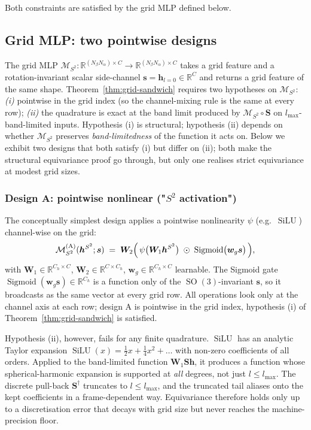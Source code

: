 \documentclass[11pt,a4paper]{article}
\DeclareMathOperator{\SO}{SO}
\DeclareMathOperator{\SiLU}{SiLU}
\DeclareMathOperator{\Sigmoid}{Sigmoid}
\newcommand{\R}{\mathbb{R}}
\newcommand{\Sph}{S^2}
\newcommand{\bh}{\bm{h}}
\newcommand{\lmax}{l_{\max}}
\theoremstyle{plain}
\theoremstyle{definition}
\theoremstyle{remark}
\begin{document}
Both constraints are satisfied by the grid MLP defined below.

\subsection{Grid MLP: two pointwise designs}\label{sec:gridmlp}

The grid MLP $\mathcal{M}_{\Sph}\colon\R^{(N_\beta N_\alpha)\times
        C}\to\R^{(N_\beta N_\alpha)\times C}$ takes a grid feature and a
rotation-invariant scalar side-channel $\bm{s}=\bh_{l=0}\in\R^C$ and returns a
grid feature of the same shape. Theorem~\ref{thm:grid-sandwich} requires two
hypotheses on $\mathcal{M}_{\Sph}$: \emph{(i)} pointwise in the grid index (so
the channel-mixing rule is the same at every row); \emph{(ii)} the quadrature
is exact at the band limit produced by $\mathcal{M}_{\Sph}\circ\bm{S}$ on
$\lmax$-band-limited inputs. Hypothesis (i) is structural; hypothesis (ii)
depends on whether $\mathcal{M}_{\Sph}$ preserves \emph{band-limitedness} of
the function it acts on. Below we exhibit two designs that both satisfy (i) but
differ on (ii); both make the structural equivariance proof go through, but
only one realises strict equivariance at modest grid sizes.

\subsubsection*{Design A: pointwise nonlinear ("$S^2$ activation")}

The conceptually simplest design applies a pointwise nonlinearity $\psi$ (e.g.\
$\SiLU$) channel-wise on the grid:
\begin{equation}\label{eq:gridmlp-A}
    \mathcal{M}_{\Sph}^{(\mathrm{A})}(\bh^{\Sph};\bm{s})\;=\;\bm{W}_2\Bigl(\,\psi\bigl(\bm{W}_1\bh^{\Sph}\bigr)\;\odot\;\Sigmoid\bigl(\bm{w}_g\bm{s}\bigr)\,\Bigr),
\end{equation}
with $\bm{W}_1\in\R^{C_h\times C}$, $\bm{W}_2\in\R^{C\times C_h}$, $\bm{w}_g\in\R^{C_h\times C}$ learnable.
The Sigmoid gate $\Sigmoid(\bm{w}_g\bm{s})\in\R^{C_h}$ is a function only of the $\SO(3)$-invariant $\bm{s}$, so it broadcasts as the same vector at every grid row.
All operations look only at the channel axis at each row; design A is pointwise in the grid index, hypothesis (i) of Theorem~\ref{thm:grid-sandwich} is satisfied.

Hypothesis (ii), however, fails for any finite quadrature. $\SiLU$ has an
analytic Taylor expansion $\SiLU(x)=\tfrac12 x+\tfrac14 x^2+\dots$ with
non-zero coefficients of all orders. Applied to the band-limited function
$\bm{W}_1\bm{S}\bh$, it produces a function whose spherical-harmonic expansion
is supported at \emph{all} degrees, not just $l\le\lmax$. The discrete
pull-back $\bm{S}^{\dagger}$ truncates to $l\le\lmax$, and the truncated tail
aliases onto the kept coefficients in a frame-dependent way. Equivariance
therefore holds only up to a discretisation error that decays with grid size
but never reaches the machine-precision floor.
\end{document}
